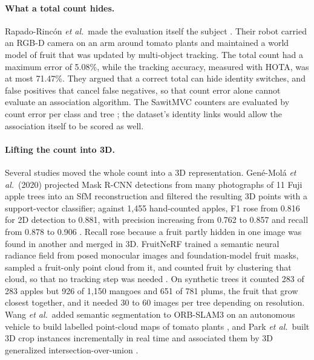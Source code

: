 \paragraph{What a total count hides.} Rapado-Rincón \textit{et al.}\ made the evaluation itself the subject \cite{ledger_r_700d34dae0f20d78}. Their robot carried an RGB-D camera on an arm around tomato plants and maintained a world model of fruit that was updated by multi-object tracking. The total count had a maximum error of 5.08\%, while the tracking accuracy, measured with HOTA, was at most 71.47\%. They argued that a correct total can hide identity switches, and false positives that cancel false negatives, so that count error alone cannot evaluate an association algorithm. The SawitMVC counters are evaluated by count error per class and tree \cite{indriani2026sawitmvc}; the dataset's identity links would allow the association itself to be scored as well.

\paragraph{Lifting the count into 3D.} Several studies moved the whole count into a 3D representation. Gené-Molá \textit{et al.}\ (2020) projected Mask R-CNN detections from many photographs of 11 Fuji apple trees into an SfM reconstruction and filtered the resulting 3D points with a support-vector classifier; against 1{,}455 hand-counted apples, F1 rose from 0.816 for 2D detection to 0.881, with precision increasing from 0.762 to 0.857 and recall from 0.878 to 0.906 \cite{genemola2020fruit3d}. Recall rose because a fruit partly hidden in one image was found in another and merged in 3D. FruitNeRF trained a semantic neural radiance field from posed monocular images and foundation-model fruit masks, sampled a fruit-only point cloud from it, and counted fruit by clustering that cloud, so that no tracking step was needed \cite{ledger_m_1210e3ea00486b68}. On synthetic trees it counted 283 of 283 apples but 926 of 1{,}150 mangoes and 651 of 781 plums, the fruit that grow closest together, and it needed 30 to 60 images per tree depending on resolution. Wang \textit{et al.}\ added semantic segmentation to ORB-SLAM3 on an autonomous vehicle to build labelled point-cloud maps of tomato plants \cite{ledger_r_b2e0e9aabad17a97}, and Park \textit{et al.}\ built 3D crop instances incrementally in real time and associated them by 3D generalized intersection-over-union \cite{park2026cropassociation}.

